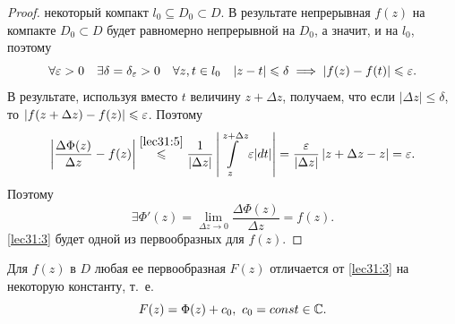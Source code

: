 \documentclass[../../main.tex]{subfiles}
\begin{document}
\begin{proof}
	некоторый компакт $ l_0 \subseteq D_0 \subset D$. В результате
	непрерывная $f(z)$ на компакте $D_0 \subset D$ будет равномерно
	непрерывной на $D_0$, а значит, и на $l_0$, поэтому
	\[ \forall \varepsilon > 0 \quad \exists \delta = \delta_\varepsilon
	> 0 \quad \forall z, t \in l_0 \quad |z - t| \leqslant \delta
	\implies |f(z) - f(t)| \leqslant \varepsilon. \]
	В результате, используя вместо $t$ величину $ z + \Delta z $, получаем, что
	если $| \Delta z| \le \delta$, то
	${| f(z + \Delta z ) - f(z) | \leqslant \varepsilon}$.
	Поэтому
	\[ \left| \dfrac{\Delta \Phi(z)}{\Delta z} - f(z) \right|
	\stackrel{ \eqref{lec31:5} }{\leqslant}
	\dfrac{1}{ | \Delta z | } \left| \int\limits_{z}^{z + \Delta z}
	\varepsilon |dt| \right| = 
	\dfrac{\varepsilon}{ | \Delta z | } \left| z + \Delta
	z - z \right| = \varepsilon.\]
	Поэтому
	\[ \exists \Phi ' (z) = \lim\limits_{\Delta z \to 0}
	\dfrac{\Delta \Phi(z)}{\Delta z} = f(z). \]	
	\eqref{lec31:3} будет одной из первообразных для $f(z)$.
\end{proof}

\begin{crl*}
	Для $ f(z) $ в $D$ любая ее первообразная $F(z)$ отличается от
	\eqref{lec31:3} на некоторую константу,
	т.~е.
	\begin{equation}
	\label{lec31:6}
		F(z) = \Phi(z) + c_0,\ c_0 = const \in \mathbb{C}.
	\end{equation}
\end{crl*}
\end{document}
